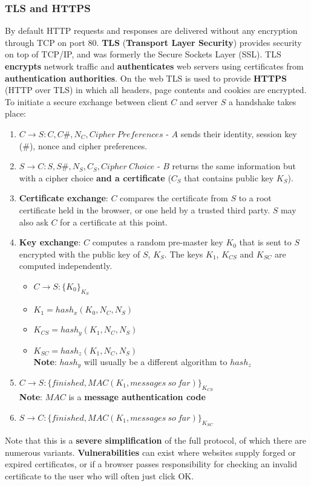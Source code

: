 \documentclass[final]{article}
\newcommand{\np}{\vspace{8pt} \\}
\begin{document}
\subsubsection{TLS and HTTPS}
By default HTTP requests and responses are delivered without any encryption through TCP on port 80. \textbf{TLS} (\textbf{Transport Layer Security}) provides security on top of TCP/IP, and was formerly the Secure Sockets Layer (SSL). TLS \textbf{encrypts} network traffic and \textbf{authenticates} web servers using certificates from \textbf{authentication authorities}. On the web TLS is used to provide \textbf{HTTPS} (HTTP over TLS) in which all headers, page contents and cookies are encrypted. \np
To initiate a secure exchange between client $ C $ and server $ S $ a handshake takes place:
\begin{enumerate}
	\item $ C \rightarrow S : C, C\#, N_{C}, Cipher\ Preferences $ - $ A $ sends their identity, session key (\#), nonce and cipher preferences.
	\item $ S \rightarrow C : S, S\#, N_{S}, C_{S}, Cipher\ Choice $ - $ B $ returns the same information but with a cipher choice \textbf{and a certificate} ($ C_{S} $ that contains public key $ K_{S} $).
	\item \textbf{Certificate exchange}: $ C $ compares the certificate from $ S $ to a root certificate held in the browser, or one held by a trusted third party. $ S $ may also ask $ C $ for a certificate at this point.
	\item \textbf{Key exchange}: $ C $ computes a random pre-master key $ K_{0} $ that is sent to $ S $ encrypted with the public key of $ S $, $ K_{S} $. The keys $ K_{1} $, $ K_{CS} $ and $ K_{SC} $ are computed independently. 
	\begin{itemize}
		\item $ C \rightarrow S : \{ K_{0} \}_{K_{S}} $
		\item $ K_{1} = hash_x(K_{0}, N_{C}, N_{S}) $
		\item $ K_{CS} = hash_y(K_{1}, N_{C}, N_{S}) $
		\item $ K_{SC} = hash_z(K_{1}, N_{C}, N_{S}) $ \\
		\textbf{Note}: $ hash_y $ will usually be a different algorithm to $ hash_z $
	\end{itemize}
	\item $ C \rightarrow S : \{ finished, MAC(K_{1}, messages\ so\ far) \}_{K_{CS}} $ \\
	\textbf{Note}: $ MAC $ is a \textbf{message authentication code}
	\item $ S \rightarrow C : \{ finished, MAC(K_{1}, messages\ so\ far) \}_{K_{SC}} $
\end{enumerate}
Note that this is a \textbf{severe simplification} of the full protocol, of which there are numerous variants. \textbf{Vulnerabilities} can exist where websites supply forged or expired certificates, or if a browser passes responsibility for checking an invalid certificate to the user who will often just click OK.
\end{document}
